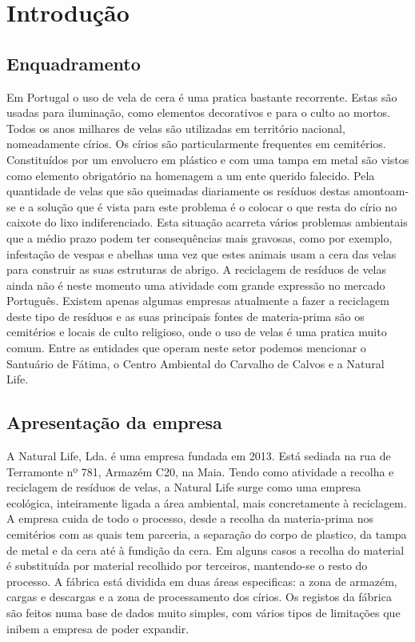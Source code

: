 \chapter{Introdução}
\label{cap:1}

\section{Enquadramento}
Em Portugal o uso de vela de cera é uma pratica bastante recorrente. Estas são usadas para iluminação, como elementos decorativos e para o culto ao mortos. Todos os anos milhares de velas são utilizadas em território nacional, nomeadamente círios. Os círios são particularmente frequentes em cemitérios. Constituídos por um envolucro em plástico e com uma tampa em metal são vistos como elemento obrigatório na homenagem a um ente querido falecido. Pela quantidade de velas que são queimadas diariamente os resíduos destas amontoam-se e a solução que é vista para este problema é o colocar o que resta do círio no caixote do lixo indiferenciado. Esta situação acarreta vários problemas ambientais que a médio prazo podem ter consequências mais gravosas, como por exemplo, infestação de vespas e abelhas uma vez que estes animais usam a cera das velas para construir as suas estruturas de abrigo.
A reciclagem de resíduos de velas ainda não é neste momento uma atividade com grande expressão no mercado Português. Existem apenas algumas empresas atualmente a fazer a reciclagem deste tipo de resíduos e as suas principais fontes de materia-prima são os cemitérios e locais de culto religioso, onde o uso de velas é uma pratica muito comum. Entre as entidades que operam neste setor podemos mencionar o Santuário de Fátima\cite{Destak2010}, o Centro Ambiental do Carvalho de Calvos\cite{SecundinoCunha2016} e a Natural Life\cite{NaturalLife}.

\section{Apresentação da empresa}
A Natural Life, Lda. é uma empresa fundada em 2013. Está sediada na rua de Terramonte nº 781, Armazém C20, na Maia. Tendo como atividade a recolha e reciclagem de resíduos de velas, a Natural Life surge como uma empresa ecológica, inteiramente ligada a área ambiental, mais concretamente à reciclagem\cite{NaturalLife}. A empresa cuida de todo o processo, desde a recolha da materia-prima nos cemitérios com as quais tem parceria, a separação do corpo de plastico, da tampa de metal e da cera até à fundição da cera. Em alguns casos a recolha do material é substituída por material recolhido por terceiros, mantendo-se o resto do processo. A fábrica está dividida em duas áreas especificas: a zona de armazém, cargas e descargas e a zona de processamento dos círios. Os registos da fábrica são feitos numa base de dados muito simples, com vários tipos de limitações que inibem a empresa de poder expandir.

